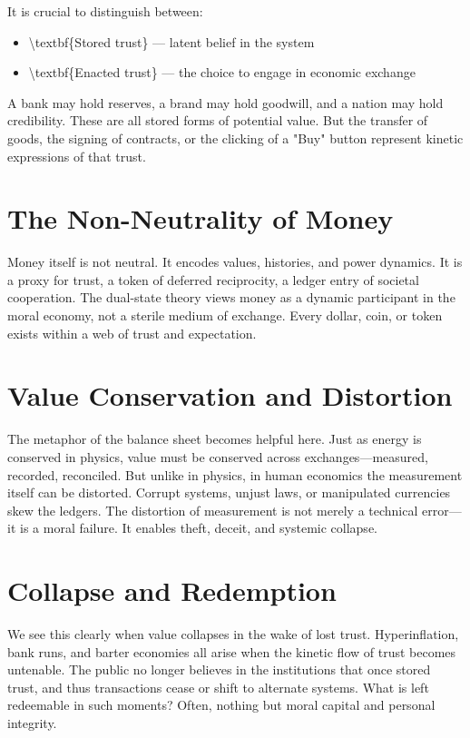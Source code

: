 \documentclass[11pt,oneside]{book}
\begin{document}
It is crucial to distinguish between:
\begin{itemize}
\item \textbackslash textbf\{Stored trust\} — latent belief in the system
\item \textbackslash textbf\{Enacted trust\} — the choice to engage in economic exchange
\end{itemize}

A bank may hold reserves, a brand may hold goodwill, and a nation may hold credibility. These are all stored forms of potential value. But the transfer of goods, the signing of contracts, or the clicking of a "Buy" button represent kinetic expressions of that trust.

\section{The Non-Neutrality of Money}

Money itself is not neutral. It encodes values, histories, and power dynamics. It is a proxy for trust, a token of deferred reciprocity, a ledger entry of societal cooperation. The dual-state theory views money as a dynamic participant in the moral economy, not a sterile medium of exchange. Every dollar, coin, or token exists within a web of trust and expectation.

\section{Value Conservation and Distortion}

The metaphor of the balance sheet becomes helpful here. Just as energy is conserved in physics, value must be conserved across exchanges—measured, recorded, reconciled. But unlike in physics, in human economics the measurement itself can be distorted. Corrupt systems, unjust laws, or manipulated currencies skew the ledgers. The distortion of measurement is not merely a technical error—it is a moral failure. It enables theft, deceit, and systemic collapse.

\section{Collapse and Redemption}

We see this clearly when value collapses in the wake of lost trust. Hyperinflation, bank runs, and barter economies all arise when the kinetic flow of trust becomes untenable. The public no longer believes in the institutions that once stored trust, and thus transactions cease or shift to alternate systems. What is left redeemable in such moments? Often, nothing but moral capital and personal integrity.
\end{document}
